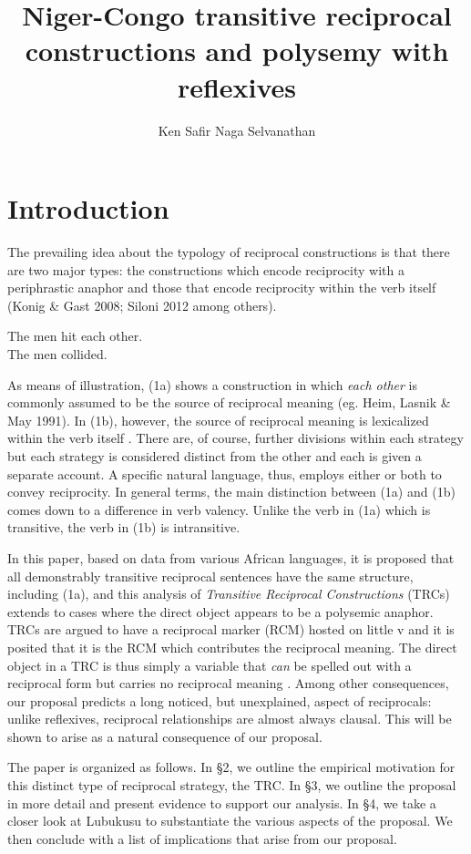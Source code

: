 \documentclass[output=paper]{langsci/langscibook}
\title{Niger-Congo transitive reciprocal constructions and polysemy with reflexives}
\author{%
 Ken Safir\lastand 
 Naga Selvanathan \affiliation{Rutgers University} 
}
\begin{document}
 

\section{Introduction}

 The prevailing idea about the typology of reciprocal constructions is that there are two major types: the constructions which encode reciprocity with a periphrastic anaphor and those that encode reciprocity within the verb itself (Konig \& Gast 2008; Siloni 2012 among others).


\ea
\ea
The men hit each other.  \\
\ex
The men collided.\\
\z
\z

As means of illustration, (1a) shows a construction in which \textit{each other} is commonly assumed to be the source of reciprocal meaning (eg. Heim, Lasnik \& May 1991). In (1b), however, the source of reciprocal meaning is lexicalized within the verb itself \citep{Siloni2012}.  There are, of course, further divisions within each strategy but each strategy is considered distinct from the other and each is given a separate account. A specific natural language, thus, employs either or both to convey reciprocity. In general terms, the main distinction between (1a) and (1b) comes down to a difference in verb valency. Unlike the verb in (1a) which is transitive, the verb in (1b) is intransitive.
 
  In this paper, based on data from various African languages, it is proposed that all demonstrably transitive reciprocal sentences have the same structure, including (1a), and this analysis of \textit{Transitive Reciprocal Constructions} (TRCs) extends to cases where the direct object appears to be a polysemic anaphor. TRCs are argued to have a reciprocal marker (RCM) hosted on little v and it is posited that it is the RCM which contributes the reciprocal meaning. The direct object in a TRC is thus simply a variable that \textit{can} be spelled out with a reciprocal form but carries no reciprocal meaning \citep{Safir2014}. Among other consequences, our proposal predicts a long noticed, but unexplained, aspect of reciprocals: unlike reflexives, reciprocal relationships are almost always clausal. This will be shown to arise as a natural consequence of our proposal.
 
  The paper is organized as follows. In §2, we outline the empirical motivation for this distinct type of reciprocal strategy, the TRC. In §3, we outline the proposal in more detail and present evidence to support our analysis. In §4, we take a closer look at Lubukusu to substantiate the various aspects of the proposal. We then conclude with a list of implications that arise from our proposal.
 
\end{document}
